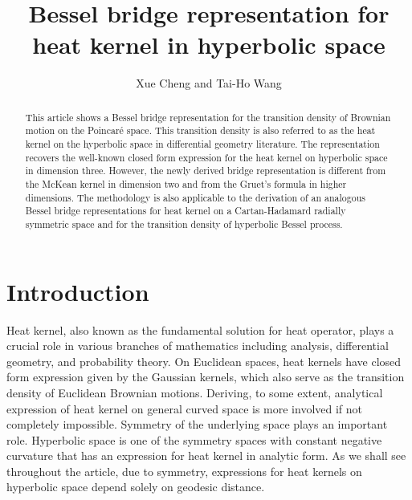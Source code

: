 \documentclass[12pt, reqno]{amsart}
\numberwithin{equation}{section}
\begin{document}
\title[Bessel bridge representation hyperbolic heat kernel]
{Bessel bridge representation for heat kernel in hyperbolic space}
\begin{abstract}
This article shows a Bessel bridge representation for the transition density of Brownian motion on the Poincar\'e space. This transition density is also referred to as the heat kernel on the hyperbolic space in differential geometry literature. The representation recovers the well-known closed form expression for the heat kernel on hyperbolic space in dimension three. However, the newly derived bridge representation is different from the McKean kernel in dimension two and from the Gruet's formula in higher dimensions. The methodology is also applicable to the derivation of an analogous Bessel bridge representations for heat kernel on a Cartan-Hadamard radially symmetric space and for the transition density of hyperbolic Bessel process.
\end{abstract}


\author[X. Cheng and T.-H. Wang]
{Xue Cheng and Tai-Ho Wang}

\address{Xue Cheng \newline
LMEQF, Department of Financial Mathematics \newline
School of Mathematical Sciences, Peking University \newline
Beijing, China
}


\address{Tai-Ho Wang \newline
Department of Mathematics \newline
Baruch College, The City University of New York  Bernard Baruch Way, New York, NY10010
}


\maketitle

%
%

\section{Introduction}

Heat kernel, also known as the fundamental solution for heat operator, plays a crucial role in various branches of mathematics including analysis, differential geometry, and probability theory.
On Euclidean spaces, heat kernels have closed form expression given by the Gaussian kernels, which also serve as the transition density of Euclidean Brownian motions. Deriving, to some extent, analytical expression of heat kernel on general curved space is more involved if not completely impossible. Symmetry of the underlying space plays an important role. Hyperbolic space is one of the symmetry spaces with constant negative curvature that has an expression for heat kernel in analytic form. As we shall see throughout the article, due to symmetry, expressions for heat kernels on hyperbolic space depend solely on geodesic distance. 
\end{document}
